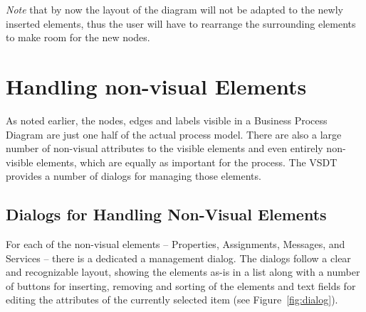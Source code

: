 \emph{Note} that by now the layout of the diagram will not be adapted to the newly
inserted elements, thus the user will have to rearrange the surrounding elements
to make room for the new nodes.




\section{Handling non-visual Elements}

As noted earlier, the nodes, edges and labels visible in a Business Process
Diagram are just one half of the actual process model.  There are also a large
number of non-visual attributes to the visible elements and even entirely
non-visible elements, which are equally as important for the process.  The VSDT
provides a number of dialogs for managing those elements.



\subsection{Dialogs for Handling Non-Visual Elements}

For each of the non-visual elements -- Properties, Assignments, Messages, and
Services -- there is a dedicated a management dialog.  The dialogs follow a
clear and recognizable layout, showing the elements as-is in a list along with a
number of buttons for inserting, removing and sorting of the elements and text
fields for editing the attributes of the currently selected item (see
Figure~\ref{fig:dialog}).

